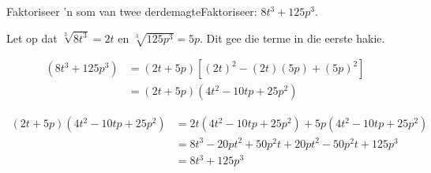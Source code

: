 \begin{wex}{Faktoriseer 'n som van twee derdemagte}{Faktoriseer: $8t^{3} +125p^{3}$.}
{

Let op dat $\sqrt[3]{8t^{3}} = 2t$ en $\sqrt[3]{125p^{3}} = 5p$. Dit gee die terme in die eerste hakie.
\newline

\begin{align*}
  (8t^{3} +125p^{3}) &= (2t + 5p)\left[(2t)^{2} - (2t)(5p)+(5p)^{2}\right] \\
                     &= (2t+5p)(4t^{2} - 10tp + 25p^{2})
\end{align*}

\begin{align*}
  (2t+5p)(4t^{2} - 10tp + 25p^{2}) &= 2t(4t^{2} - 10tp + 25p^{2})+5p(4t^{2} - 10tp + 25p^{2})\\
		   &= 8t^{3} - 20pt^{2} + 50p^{2}t+ 20pt^{2} - 50p^{2}t + 125p^{3}\\
		   &= 8t^{3} +125p^{3}\\
\end{align*}
}
\end{wex}


